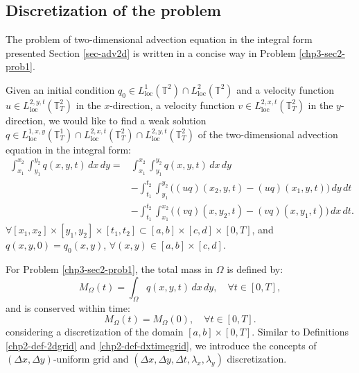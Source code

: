 \subsection{Discretization of the problem}
The problem of two-dimensional advection equation in the integral form 
presented Section \ref{sec-adv2d} is written in a concise way in Problem \ref{chp3-sec2-prob1}.
\begin{prob}
	\label{chp3-sec2-prob1}
	Given an initial condition ${q}_0\in {L}^{1}_{\text{loc}}(\mathbb{T}^2) \cap {L}^{2}_{\text{loc}}(\mathbb{T}^2)$ and
	a velocity function $u \in {L}^{2,y,t}_{\text{loc}}(\mathbb{T}^2_{T})$ in the $x$-direction, 
	a velocity function $v \in {L}^{2,x,t}_{\text{loc}}(\mathbb{T}^2_{T})$ in the $y$-direction, 
 	we would like to find a weak solution 
 	${q} \in {L}^{1,x,y}_{\text{loc}}(\mathbb{T}^1_{T}) \cap {L}^{2,x,t}_{\text{loc}}(\mathbb{T}^2_{T}) \cap {L}^{2,y,t}_{\text{loc}}(\mathbb{T}^2_{T})$
	of the two-dimensional advection equation in the integral form:
	\begin{align*}
		\int_{x_1}^{x_2} \int_{y_1}^{y_2}
		{q}(x, y, t) \,dx \,dy = &\int_{x_1}^{x_2} \int_{y_1}^{y_2}
		{q}(x, y, t) \,dx \,dy \\ \nonumber
		&-\int_{t_1}^{t_2} \int_{y_1}^{y_2} \bigg({(uq)}(x_2, y, t)
		-{(uq)}(x_1, y, t) \bigg) \,dy \,dt\\ \nonumber
		&-\int_{t_1}^{t_2} \int_{x_1}^{x_2} \bigg({(vq)}(x, y_2, t)
		-{(vq)}(x, y_1, t) \bigg) \,dx \,dt.
	\end{align*}
	$\forall [x_1, x_2]\times [y_1, y_2] \times[t_1, t_2] \subset [a,b] \times [c,d] \times[0,T]$, 
	and ${q}(x, y, 0) = {q}_0(x, y)$, $\forall (x, y) \in [a,b] \times [c,d]$.
\end{prob}
For Problem \ref{chp3-sec2-prob1}, the total mass in $\Omega$ is defined by: 
\begin{equation}
	{M}_{\Omega}(t) = \int_{\Omega} {q}(x,y,t) \,dx \,dy , \quad \forall t \in [0,T],
\end{equation}
and is conserved within time: 
\begin{equation}
	{M}_{\Omega}(t) = {M}_{\Omega}(0), \quad \forall t \in [0,T].
\end{equation}
considering a discretization of the domain $[a,b] \times [0,T]$. 
Similar to Definitions \ref{chp2-def-2dgrid} and \ref{chp2-def-dxtimegrid},
we introduce the concepts of $(\Delta x,\Delta y)$-uniform grid and $(\Delta x, \Delta y,\Delta t, \lambda_x,\lambda_y)$ discretization.

